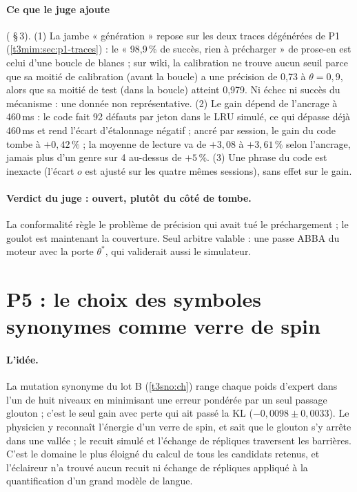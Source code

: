 \paragraph{Ce que le juge ajoute} ( §\,3). (1) La jambe « génération » repose sur les deux traces dégénérées de P1 (\cref{t3mim:sec:p1-traces}) : le « 98,9\,\% de succès, rien à précharger » de prose-en est celui d'une boucle de blancs ; sur wiki, la calibration ne trouve aucun seuil parce que sa moitié de calibration (avant la boucle) a une précision de 0,73 à $\theta = 0{,}9$, alors que sa moitié de test (dans la boucle) atteint 0,979. Ni échec ni succès du mécanisme : une donnée non représentative. (2) Le gain dépend de l'ancrage à 460\,ms : le code fait 92 défauts par jeton dans le LRU simulé, ce qui dépasse déjà 460\,ms et rend l'écart d'étalonnage négatif ; ancré par session, le gain du code tombe à $+0{,}42\,\%$ ; la moyenne de lecture va de $+3{,}08$ à $+3{,}61\,\%$ selon l'ancrage, jamais plus d'un genre sur 4 au-dessus de $+5\,\%$. (3) Une phrase du code est inexacte (l'écart $o$ est ajusté sur les quatre mêmes sessions), sans effet sur le gain.

\paragraph{Verdict du juge : ouvert, plutôt du côté de tombe.} La conformalité règle le problème de précision qui avait tué le préchargement ; le goulot est maintenant la couverture. Seul arbitre valable : une passe ABBA du moteur avec la porte $\theta^\ast$, qui validerait aussi le simulateur.

\section{P5 : le choix des symboles synonymes comme verre de spin}\label{t3mim:sec:p5}

\paragraph{L'idée.} La mutation synonyme du lot B (\cref{t3sno:ch}) range chaque poids d'expert dans l'un de huit niveaux en minimisant une erreur pondérée par un seul passage glouton ; c'est le seul gain avec perte qui ait passé la KL ($-0{,}0098 \pm 0{,}0033$). Le physicien y reconnaît l'énergie d'un verre de spin, et sait que le glouton s'y arrête dans une vallée ; le recuit simulé \cite{kirkpatrick1983} et l'échange de répliques \cite{hukushima1996} traversent les barrières. C'est le domaine le plus éloigné du calcul de tous les candidats retenus, et l'éclaireur n'a trouvé aucun recuit ni échange de répliques appliqué à la quantification d'un grand modèle de langue.

